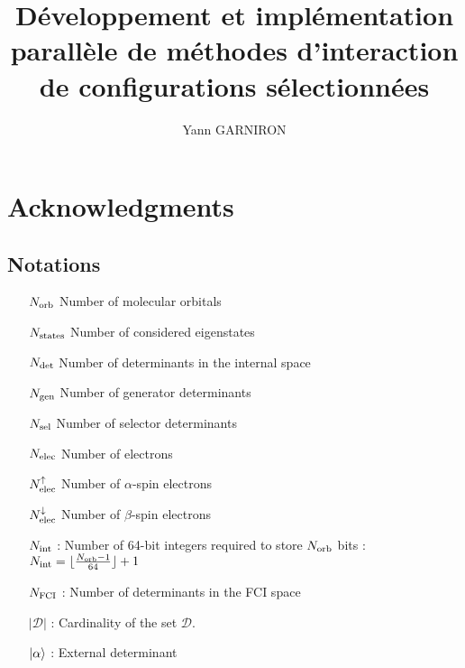 \documentclass[12pt,a4paper]{report}
\title{Développement et implémentation parallèle de méthodes d'interaction de configurations sélectionnées}
\author{Yann GARNIRON}
\begin{document}
\dominitoc


\newpage

\chapter*{Acknowledgments}







\newpage

\tableofcontents
\newpage

\section*{Notations}

\begin{itemize}

\item [${N_\text{orb}}$] Number of molecular orbitals

\item [${N_\text{states}}$] Number of considered eigenstates

\item [${N_\text{det}}$] Number of determinants in the internal space

\item [${N_\text{gen}}$] Number of generator determinants 

\item [${N_\text{sel}}$] Number of selector determinants

\item [${N_\text{elec}}$] Number of electrons

\item [${N_\text{elec}^{\uparrow}}$] Number of $\alpha$-spin electrons

\item [${N_\text{elec}^{\downarrow}}$] Number of $\beta$-spin electrons

\item [${N_\text{int}}$] : Number of 64-bit integers required to store ${N_\text{orb}}$ bits : 
${{N_\text{int}} = \lfloor \frac{{N_\text{orb}}-1}{64} \rfloor + 1}$

%

\item [$N_\text{FCI}$] : Number of determinants in the FCI space

\item [$|\mathcal{D}|$] : Cardinality of the set $\mathcal{D}$.

\item [${\ket{\alpha}}$] : External determinant
\end{itemize}
\end{document}
